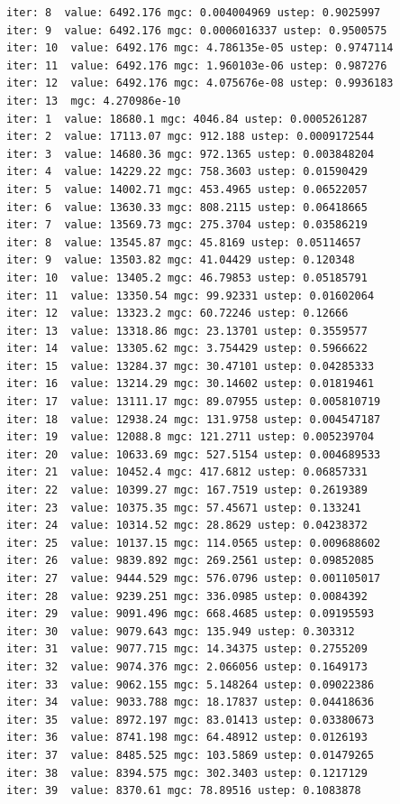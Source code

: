 \documentclass[
  letterpaper,
  DIV=11,
  numbers=noendperiod]{scrartcl}
\begin{document}
\begin{verbatim}
iter: 8  value: 6492.176 mgc: 0.004004969 ustep: 0.9025997 
iter: 9  value: 6492.176 mgc: 0.0006016337 ustep: 0.9500575 
iter: 10  value: 6492.176 mgc: 4.786135e-05 ustep: 0.9747114 
iter: 11  value: 6492.176 mgc: 1.960103e-06 ustep: 0.987276 
iter: 12  value: 6492.176 mgc: 4.075676e-08 ustep: 0.9936183 
iter: 13  mgc: 4.270986e-10 
iter: 1  value: 18680.1 mgc: 4046.84 ustep: 0.0005261287 
iter: 2  value: 17113.07 mgc: 912.188 ustep: 0.0009172544 
iter: 3  value: 14680.36 mgc: 972.1365 ustep: 0.003848204 
iter: 4  value: 14229.22 mgc: 758.3603 ustep: 0.01590429 
iter: 5  value: 14002.71 mgc: 453.4965 ustep: 0.06522057 
iter: 6  value: 13630.33 mgc: 808.2115 ustep: 0.06418665 
iter: 7  value: 13569.73 mgc: 275.3704 ustep: 0.03586219 
iter: 8  value: 13545.87 mgc: 45.8169 ustep: 0.05114657 
iter: 9  value: 13503.82 mgc: 41.04429 ustep: 0.120348 
iter: 10  value: 13405.2 mgc: 46.79853 ustep: 0.05185791 
iter: 11  value: 13350.54 mgc: 99.92331 ustep: 0.01602064 
iter: 12  value: 13323.2 mgc: 60.72246 ustep: 0.12666 
iter: 13  value: 13318.86 mgc: 23.13701 ustep: 0.3559577 
iter: 14  value: 13305.62 mgc: 3.754429 ustep: 0.5966622 
iter: 15  value: 13284.37 mgc: 30.47101 ustep: 0.04285333 
iter: 16  value: 13214.29 mgc: 30.14602 ustep: 0.01819461 
iter: 17  value: 13111.17 mgc: 89.07955 ustep: 0.005810719 
iter: 18  value: 12938.24 mgc: 131.9758 ustep: 0.004547187 
iter: 19  value: 12088.8 mgc: 121.2711 ustep: 0.005239704 
iter: 20  value: 10633.69 mgc: 527.5154 ustep: 0.004689533 
iter: 21  value: 10452.4 mgc: 417.6812 ustep: 0.06857331 
iter: 22  value: 10399.27 mgc: 167.7519 ustep: 0.2619389 
iter: 23  value: 10375.35 mgc: 57.45671 ustep: 0.133241 
iter: 24  value: 10314.52 mgc: 28.8629 ustep: 0.04238372 
iter: 25  value: 10137.15 mgc: 114.0565 ustep: 0.009688602 
iter: 26  value: 9839.892 mgc: 269.2561 ustep: 0.09852085 
iter: 27  value: 9444.529 mgc: 576.0796 ustep: 0.001105017 
iter: 28  value: 9239.251 mgc: 336.0985 ustep: 0.0084392 
iter: 29  value: 9091.496 mgc: 668.4685 ustep: 0.09195593 
iter: 30  value: 9079.643 mgc: 135.949 ustep: 0.303312 
iter: 31  value: 9077.715 mgc: 14.34375 ustep: 0.2755209 
iter: 32  value: 9074.376 mgc: 2.066056 ustep: 0.1649173 
iter: 33  value: 9062.155 mgc: 5.148264 ustep: 0.09022386 
iter: 34  value: 9033.788 mgc: 18.17837 ustep: 0.04418636 
iter: 35  value: 8972.197 mgc: 83.01413 ustep: 0.03380673 
iter: 36  value: 8741.198 mgc: 64.48912 ustep: 0.0126193 
iter: 37  value: 8485.525 mgc: 103.5869 ustep: 0.01479265 
iter: 38  value: 8394.575 mgc: 302.3403 ustep: 0.1217129 
iter: 39  value: 8370.61 mgc: 78.89516 ustep: 0.1083878 

\end{verbatim}
\end{document}
